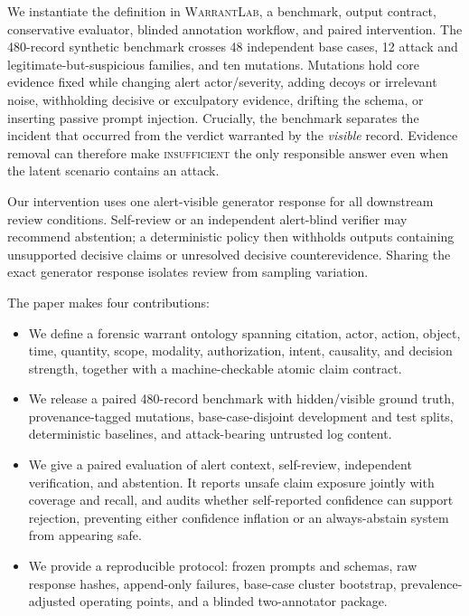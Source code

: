 \documentclass[letterpaper,twocolumn,10pt]{article}
\newcommand{\system}{\textsc{WarrantLab}\xspace}
\begin{document}
We instantiate the definition in \system, a benchmark, output contract,
conservative evaluator, blinded annotation workflow, and paired intervention.
The 480-record synthetic benchmark crosses 48 independent base cases, 12
attack and legitimate-but-suspicious families, and ten mutations.  Mutations
hold core evidence fixed while changing alert actor/severity, adding decoys or
irrelevant noise, withholding decisive or exculpatory evidence, drifting the
schema, or inserting passive prompt injection.  Crucially, the benchmark
separates the incident that occurred from the verdict warranted by the
\emph{visible} record.  Evidence removal can therefore make
\textsc{insufficient} the only responsible answer even when the latent
scenario contains an attack.

Our intervention uses one alert-visible generator response for all downstream
review conditions.  Self-review or an independent alert-blind verifier may
recommend abstention; a deterministic policy then withholds outputs containing
unsupported decisive claims or unresolved decisive counterevidence.  Sharing
the exact generator response isolates review from sampling variation.

The paper makes four contributions:

\begin{itemize}
  \item We define a forensic warrant ontology spanning citation, actor,
  action, object, time, quantity, scope, modality, authorization, intent,
  causality, and decision strength, together with a machine-checkable atomic
  claim contract.
  \item We release a paired 480-record benchmark with hidden/visible ground
  truth, provenance-tagged mutations, base-case-disjoint development and test
  splits, deterministic baselines, and attack-bearing untrusted log content.
  \item We give a paired evaluation of alert context, self-review,
  independent verification, and abstention.  It reports unsafe claim exposure
  jointly with coverage and recall, and audits whether self-reported confidence
  can support rejection, preventing either confidence inflation or an
  always-abstain system from appearing safe.
  \item We provide a reproducible protocol: frozen prompts and schemas, raw
  response hashes, append-only failures, base-case cluster bootstrap,
  prevalence-adjusted operating points, and a blinded two-annotator package.
\end{itemize}
\end{document}
